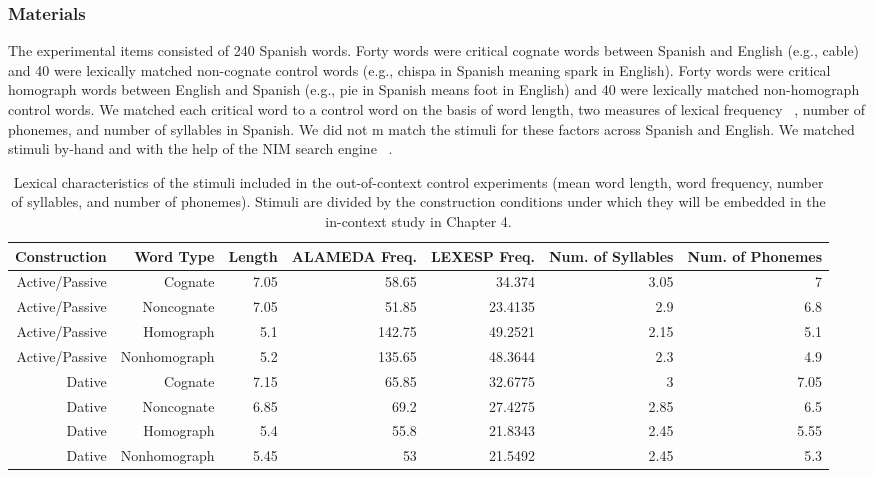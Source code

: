 \subsubsection{Materials}
\label{materials}

The experimental items consisted of 240 Spanish words. Forty words were critical cognate words between Spanish and English (e.g., cable) and 40 were lexically matched non-cognate control words (e.g., chispa in Spanish meaning spark in English). Forty words were critical homograph words between English and Spanish (e.g., pie in Spanish means foot in English) and 40 were lexically matched non-homograph control words. We matched each critical word to a control word on the basis of word length, two measures of lexical frequency ~\citep{Alameda1995, Sebastian-Galles2000}, number of phonemes, and number of syllables in Spanish. We did not m match the stimuli for these factors across Spanish and English. We matched stimuli by-hand and with the help of the NIM search engine ~\citep{Guasch2013}. 


\begin{landscape}
\begin{table}[htbp]
  \centering
  \caption{Lexical characteristics of the stimuli included in the out-of-context control experiments (mean word length, word frequency, number of syllables, and number of phonemes). Stimuli are divided by the construction conditions under which they will be embedded in the in-context study in Chapter 4.}
    \tabcolsep=0.11cm
    \begin{tabular}{rrrrrrr}
    \toprule
    Construction & Word Type & Length & ALAMEDA Freq. & LEXESP Freq. & Num. of Syllables & Num. of Phonemes \\
    \midrule
    Active/Passive & Cognate & 7.05  & 58.65 & 34.374 & 3.05  & 7 \\
    Active/Passive & Noncognate & 7.05  & 51.85 & 23.4135 & 2.9   & 6.8 \\
    Active/Passive & Homograph & 5.1   & 142.75 & 49.2521 & 2.15  & 5.1 \\
    Active/Passive & Nonhomograph & 5.2   & 135.65 & 48.3644 & 2.3   & 4.9 \\
    Dative & Cognate & 7.15  & 65.85 & 32.6775 & 3     & 7.05 \\
    Dative & Noncognate & 6.85  & 69.2  & 27.4275 & 2.85  & 6.5 \\
    Dative & Homograph & 5.4   & 55.8  & 21.8343 & 2.45  & 5.55 \\
    Dative & Nonhomograph & 5.45  & 53    & 21.5492 & 2.45  & 5.3 \\
    \bottomrule
    \end{tabular}%
  \label{tab:ocon.lexchar}%
\end{table}%
\end{landscape}


